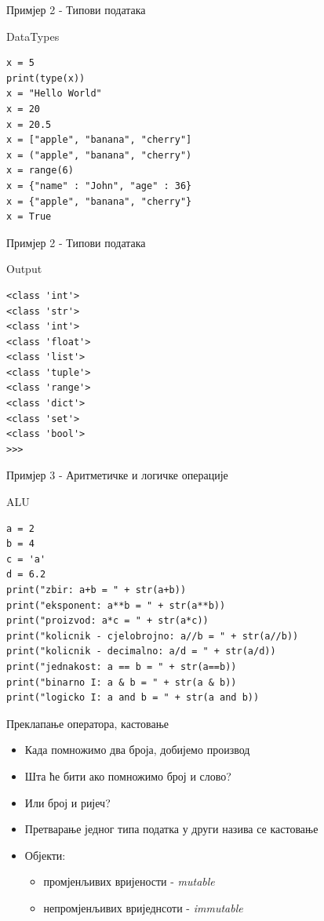 \documentclass{beamer}
\begin{document}
\begin{frame}[fragile]{Примјер 2 - Типови података}
\begin{block}{DataTypes}
\begin{lstlisting}
x = 5
print(type(x))
x = "Hello World"
x = 20
x = 20.5
x = ["apple", "banana", "cherry"]
x = ("apple", "banana", "cherry")
x = range(6)
x = {"name" : "John", "age" : 36}
x = {"apple", "banana", "cherry"}
x = True

\end{lstlisting}
\end{block}
\end{frame}

\begin{frame}[fragile]{Примјер 2 - Типови података}
\begin{block}{Output}
\begin{lstlisting}
<class 'int'>
<class 'str'>
<class 'int'>
<class 'float'>
<class 'list'>
<class 'tuple'>
<class 'range'>
<class 'dict'>
<class 'set'>
<class 'bool'>
>>> 
\end{lstlisting}
\end{block}
\end{frame}

\begin{frame}[fragile]{Примјер 3 - Аритметичке и логичке операције}
\begin{block}{ALU}
\begin{lstlisting}
a = 2
b = 4
c = 'a'
d = 6.2
print("zbir: a+b = " + str(a+b))
print("eksponent: a**b = " + str(a**b))
print("proizvod: a*c = " + str(a*c))
print("kolicnik - cjelobrojno: a//b = " + str(a//b))
print("kolicnik - decimalno: a/d = " + str(a/d))
print("jednakost: a == b = " + str(a==b))
print("binarno I: a & b = " + str(a & b))
print("logicko I: a and b = " + str(a and b))
\end{lstlisting}
\end{block}
\end{frame}

\begin{frame}{Преклапање оператора, кастовање}
    \begin{itemize}
        \item Када помножимо два броја, добијемо производ
        \item Шта ће бити ако помножимо број и слово?
        \item Или број и ријеч?
        \item Претварање једног типа податка у други назива се кастовање
        \item Објекти:
        \begin{itemize}
            \item промјенљивих вријености - \textit{mutable}
            \item непромјенљивих вриједнсоти - \textit{immutable}
        \end{itemize}
    \end{itemize}
\end{frame}
\end{document}
